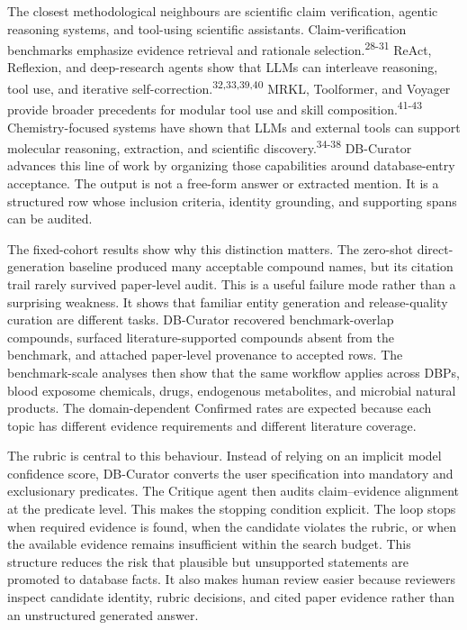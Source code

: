 \documentclass[
]{article}
\begin{document}
The closest methodological neighbours are scientific claim verification,
agentic reasoning systems, and tool-using scientific assistants.
Claim-verification benchmarks emphasize evidence retrieval and rationale
selection.\textsuperscript{28-31} ReAct, Reflexion, and deep-research
agents show that LLMs can interleave reasoning, tool use, and iterative
self-correction.\textsuperscript{32,33,39,40} MRKL, Toolformer, and
Voyager provide broader precedents for modular tool use and skill
composition.\textsuperscript{41-43} Chemistry-focused systems have shown
that LLMs and external tools can support molecular reasoning, extraction,
and scientific discovery.\textsuperscript{34-38} DB-Curator advances this
line of work by organizing those capabilities around database-entry
acceptance. The output is not a free-form answer or extracted mention. It
is a structured row whose inclusion criteria, identity grounding, and
supporting spans can be audited.

The fixed-cohort results show why this distinction matters. The
zero-shot direct-generation baseline produced many acceptable compound
names, but its citation trail rarely survived paper-level audit. This is
a useful failure mode rather than a surprising weakness. It shows that
familiar entity generation and release-quality curation are different
tasks. DB-Curator recovered benchmark-overlap compounds, surfaced
literature-supported compounds absent from the benchmark, and attached
paper-level provenance to accepted rows. The benchmark-scale analyses
then show that the same workflow applies across DBPs, blood exposome
chemicals, drugs, endogenous metabolites, and microbial natural products.
The domain-dependent Confirmed rates are expected because each topic has
different evidence requirements and different literature coverage.

The rubric is central to this behaviour. Instead of relying on an
implicit model confidence score, DB-Curator converts the user
specification into mandatory and exclusionary predicates. The Critique
agent then audits claim--evidence alignment at the predicate level. This
makes the stopping condition explicit. The loop stops when required
evidence is found, when the candidate violates the rubric, or when the
available evidence remains insufficient within the search budget. This
structure reduces the risk that plausible but unsupported statements are
promoted to database facts. It also makes human review easier because
reviewers inspect candidate identity, rubric decisions, and cited paper
evidence rather than an unstructured generated answer.
\end{document}

